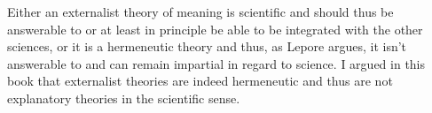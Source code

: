 Either an externalist theory of meaning is scientific and should thus be answerable to or at least in principle be able to be integrated with the other sciences, or it is a hermeneutic theory and thus, as Lepore argues, it isn’t answerable to and can remain impartial in regard to science. I argued in this book that externalist theories are indeed hermeneutic and thus are not explanatory theories in the scientific sense. 